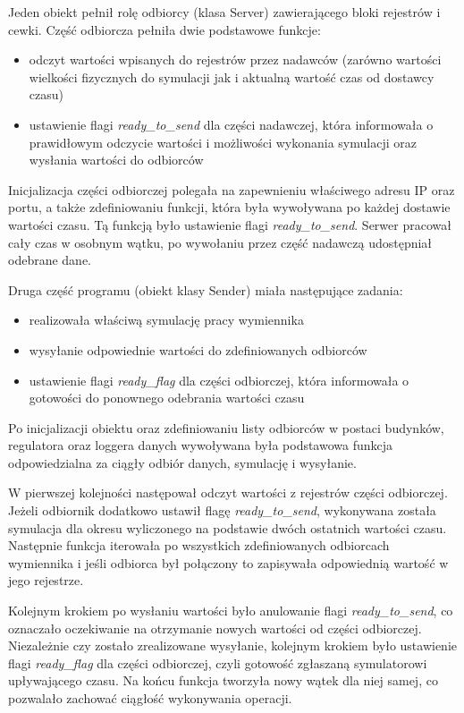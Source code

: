 	Jeden obiekt pełnił rolę odbiorcy (klasa Server) zawierającego bloki rejestrów i cewki. Część odbiorcza pełniła dwie podstawowe funkcje:
	\begin{itemize}
	\item odczyt wartości wpisanych do rejestrów przez nadawców (zarówno wartości wielkości fizycznych do symulacji jak i aktualną wartość czas od dostawcy czasu)
	\item ustawienie flagi \textit{ready\_to\_send} dla części nadawczej, która informowała o prawidłowym odczycie wartości i możliwości wykonania symulacji oraz wysłania wartości do odbiorców
	\end{itemize}
	Inicjalizacja części odbiorczej polegała na zapewnieniu właściwego adresu IP oraz portu, a także zdefiniowaniu funkcji, która była wywoływana po każdej dostawie wartości czasu. Tą funkcją było ustawienie flagi \textit{ready\_to\_send}.
Serwer pracował cały czas w osobnym wątku, po wywołaniu przez część nadawczą udostępniał odebrane dane.

	Druga część programu (obiekt klasy Sender) miała następujące zadania:
	\begin{itemize}
	\item realizowała właściwą symulację pracy wymiennika
    \item wysyłanie odpowiednie wartości do zdefiniowanych odbiorców
    \item ustawienie flagi \textit{ready\_flag} dla części odbiorczej, która informowała o gotowości do ponownego odebrania wartości czasu
	\end{itemize}
    Po inicjalizacji obiektu oraz zdefiniowaniu listy odbiorców w postaci budynków, regulatora oraz loggera danych wywoływana była podstawowa funkcja odpowiedzialna za ciągły odbiór danych, symulację i wysyłanie.

	W pierwszej kolejności następował odczyt wartości z rejestrów części odbiorczej. Jeżeli odbiornik dodatkowo ustawił flagę \textit{ready\_to\_send}, wykonywana została symulacja dla okresu wyliczonego na podstawie dwóch ostatnich wartości czasu. Następnie funkcja iterowała po wszystkich zdefiniowanych odbiorcach wymiennika i jeśli odbiorca był połączony to zapisywała odpowiednią wartość w jego rejestrze.

	Kolejnym krokiem po wysłaniu wartości było anulowanie flagi \textit{ready\_to\_send}, co oznaczało oczekiwanie na otrzymanie nowych wartości od części odbiorczej. Niezależnie czy zostało zrealizowane wysyłanie, kolejnym krokiem było ustawienie flagi \textit{ready\_flag} dla części odbiorczej, czyli gotowość zgłaszaną symulatorowi upływającego czasu. Na końcu funkcja tworzyła nowy wątek dla niej samej, co pozwalało zachować ciągłość wykonywania operacji.

